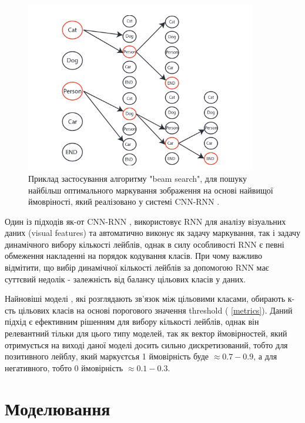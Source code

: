 \documentclass{udstu}
\begin{document}
\begin{figure}[!ht]
	\centering
	\includegraphics[width=0.9\textwidth]{PNG/cnn-rnn-lqp}
	\caption{
	Приклад застосування алгоритму "beam search", для
	пошуку найбільш оптимального маркування зображення
	на основі найвищої ймовріності, який
	реалізовано у системі CNN-RNN \cite{cnn-rnn}.
	}
	\label{figure:cnn-rnn-lqp}
\end{figure}

Один із підходів як-от CNN-RNN \cite{cnn-rnn},
використовує RNN для аналізу візуальних даних (visual features) та автоматично виконує як задачу маркування,
так і задачу динамічного вибору кількості лейблів, однак в силу особливості RNN є певні обмеження
накладенні на порядок кодування класів. При чому важливо відмітити, що вибір динамічної кількості лейблів
за допомогою RNN має суттєвий недолік - залежність від балансу цільових класів у даних.

Найновіші моделі \cite{q2l, cpsd, cma}, які розглядають зв'язок між цільовими класами, обирають
к-сть цільових класів на основі порогового значення threshold (\chaptername{ \ref{metrics}}).
Даний підхід є ефективним рішенням для вибору кількості лейблів, однак він релевантний
тільки для цього типу моделей, так як вектор ймовірностей, який отримується на виході
даної моделі досить сильно дискретизований, тобто для позитивного лейблу,
який маркуєтсья 1 ймовірність буде $\approx 0.7-0.9$,
а для негативного, тобто 0 ймовірність $\approx 0.1-0.3$.


\chapter{Моделювання}
\end{document}
